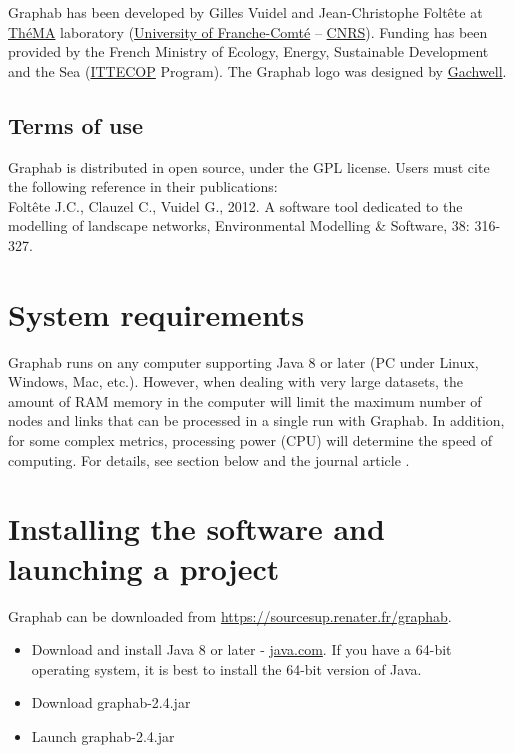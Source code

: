 \documentclass[a4paper,10pt]{report}
\begin{document}
Graphab has been developed by Gilles Vuidel and Jean-Christophe Foltête at \href{http://thema.univ-fcomte.fr/}{ThéMA} laboratory (\href{http://www.univ-fcomte.fr}{University of Franche-Comté} – \href{http://www.cnrs.fr}{CNRS}). Funding has been provided by the French Ministry of Ecology, Energy, Sustainable Development and the Sea (\href{http://www.ittecop.fr/}{ITTECOP} Program). The Graphab logo was designed by \href{http://www.gachwell.com/}{Gachwell}.

\subsection{Terms of use}

Graphab is distributed in open source, under the GPL license. Users must cite the following reference \cite{2012_graphab_EMS} in their publications:\\
Foltête J.C., Clauzel C., Vuidel G., 2012. A software tool dedicated to the modelling of landscape networks, Environmental Modelling \& Software, 38: 316-327.


\section{System requirements}

Graphab runs on any computer supporting Java 8 or later (PC under Linux, Windows, Mac, etc.). However, when dealing with very large datasets, the amount of RAM memory in the computer will limit the maximum number of nodes and links that can be processed in a single run with Graphab. In addition, for some complex metrics, processing power (CPU) will determine the speed of computing. For details, see section  below and the journal article  \cite{2012_graphab_EMS}.

\section{Installing the software and launching a project}

Graphab can be downloaded from \url{https://sourcesup.renater.fr/graphab}.

\begin{itemize}
	\item Download and install Java 8 or later - \href{http://www.java.com}{java.com}. If you have a 64-bit operating system, it is best to install the 64-bit version of Java.
	\item Download graphab-2.4.jar
	\item Launch graphab-2.4.jar
\end{itemize}
\end{document}
